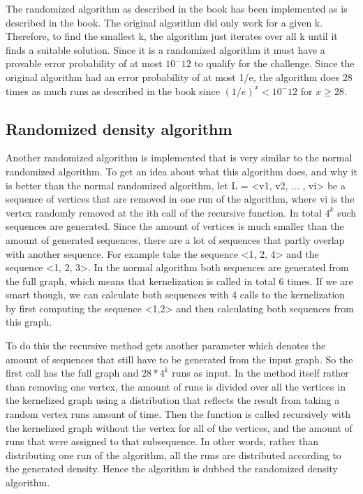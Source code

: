 The randomized algorithm as described in the book has been implemented as is described in the book. The original algorithm did only work for a given k. Therefore, to find the smallest k, the algorithm just iterates over all k until it finds a suitable solution. Since it is a randomized algorithm it must have a provable error probability of at most $10^-12$ to qualify for the challenge. Since the original algorithm had an error probability of at most 1/e, the algorithm does 28 times as much runs as described in the book since $(1/e)^x < 10^-12$ for $x \geq 28$.

\subsection{Randomized density algorithm}
Another randomized algorithm is implemented that is very similar to the normal randomized algorithm. To get an idea about what this algorithm does, and why it is better than the normal randomized algorithm, let L = <v1, v2, ... , vi> be a sequence of vertices that are removed in one run of the algorithm, where vi is the vertex randomly removed at the ith call of the recursive function. In total $4^k$ such sequences are generated. Since the amount of vertices is much smaller than the amount of generated sequences, there are a lot of sequences that partly overlap with another sequence. For example take the sequence <1, 2, 4> and the sequence <1, 2, 3>. In the normal algorithm both sequences are generated from the full graph, which means that kernelization is called in total 6 times. If we are smart though, we can calculate both sequences with 4 calls to the kernelization by first computing the sequence <1,2> and then calculating both sequences from this graph.

To do this the recursive method gets another parameter which denotes the amount of sequences that still have to be generated from the input graph. So the first call has the full graph and $28 * 4^k$ runs as input. In the method itself rather than removing one vertex, the amount of runs is divided over all the vertices in the kernelized graph using a distribution that reflects the result from taking a random vertex runs amount of time. Then the function is called recursively with the kernelized graph without the vertex for all of the vertices, and the amount of runs that were assigned to that subsequence. In other words, rather than distributing one run of the algorithm, all the runs are distributed according to the generated density. Hence the algorithm is dubbed the randomized density algorithm.

